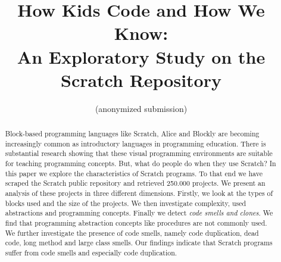 \documentclass{sig-alternate}
\begin{document}
%

\title{How Kids Code and How We Know:\\An Exploratory Study on the Scratch Repository }

\author{
\alignauthor
(anonymized submission)
}


\maketitle
\begin{abstract}
Block-based programming languages like Scratch, Alice and Blockly are becoming increasingly common as introductory languages in programming education. There is substantial research showing that these visual programming environments are suitable for teaching programming concepts. But, what do people do when they use Scratch? In this paper we explore the characteristics of Scratch programs. To that end we have scraped the Scratch public repository and retrieved 250.000 projects. We present an analysis of these projects in three different dimensions. Firstly, we look at the types of blocks used and the size of the projects. We then investigate complexity, used abstractions and programming concepts. Finally we detect \emph{code smells and clones}. We find that programming abstraction concepts like procedures are not commonly used. We further investigate the presence of code smells, namely code duplication, dead code, long method and large class smells. Our findings indicate that Scratch programs suffer from code smells and especially code duplication.
\end{abstract}
\end{document}

